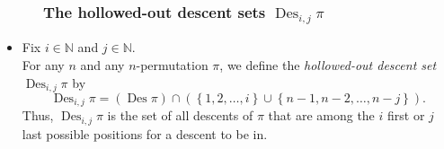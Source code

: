 \documentclass{beamer}
\newcommand{\NN}{{\mathbb N}}
\newcommand{\Des}{\operatorname{Des}}
\newcommand{\fti}[1]{\frametitle{\ \ \ \ \ #1}}
\newcommand{\set}[1]{\left\{ #1 \right\}}
\newcommand{\tup}[1]{\left( #1 \right)}
\newcommand{\defn}[1]{{\color{darkred}\emph{#1}}} %
\theoremstyle{plain}
\begin{document}
\begin{frame}
\fti{The hollowed-out descent sets $\Des_{i,j} \pi$}

\begin{itemize}

\item Fix $i \in \NN$ and $j \in \NN$. \\
      For any $n$ and any $n$-permutation $\pi$, we define
      the \defn{hollowed-out descent set $\Des_{i,j} \pi$} by
      \[
      \Des_{i,j} \pi
      = \tup{\Des \pi}
      \cap
      \tup{ \set{1, 2, \ldots, i} \cup \set{n-1, n-2, \ldots, n-j} } .
      \]
      \pause
      Thus, $\Des_{i,j} \pi$ is the set of all descents of
      $\pi$ that are among the $i$ first or $j$ last possible
      positions for a descent to be in.

\end{itemize}
\end{frame}
\end{document}
